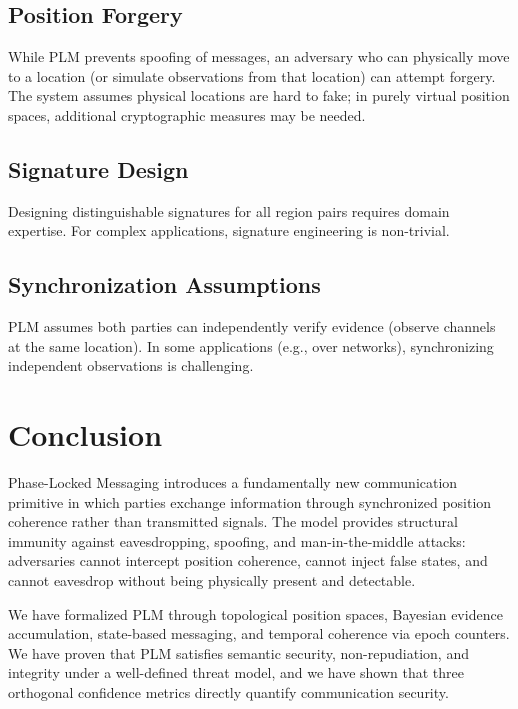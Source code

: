 \documentclass[11pt,a4paper]{article}
\theoremstyle{definition}
\begin{document}
\subsection{Position Forgery}

While PLM prevents spoofing of messages, an adversary who can physically move to a location (or simulate observations from that location) can attempt forgery. The system assumes physical locations are hard to fake; in purely virtual position spaces, additional cryptographic measures may be needed.

\subsection{Signature Design}

Designing distinguishable signatures for all region pairs requires domain expertise. For complex applications, signature engineering is non-trivial.

\subsection{Synchronization Assumptions}

PLM assumes both parties can independently verify evidence (observe channels at the same location). In some applications (e.g., over networks), synchronizing independent observations is challenging.

\section{Conclusion}
\label{sec:conclusion}

Phase-Locked Messaging introduces a fundamentally new communication primitive in which parties exchange information through synchronized position coherence rather than transmitted signals. The model provides structural immunity against eavesdropping, spoofing, and man-in-the-middle attacks: adversaries cannot intercept position coherence, cannot inject false states, and cannot eavesdrop without being physically present and detectable.

We have formalized PLM through topological position spaces, Bayesian evidence accumulation, state-based messaging, and temporal coherence via epoch counters. We have proven that PLM satisfies semantic security, non-repudiation, and integrity under a well-defined threat model, and we have shown that three orthogonal confidence metrics directly quantify communication security.
\end{document}
